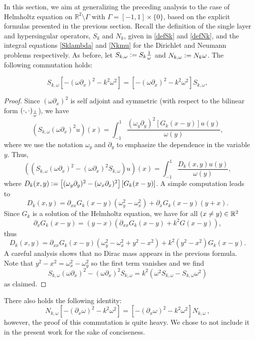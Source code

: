 \documentclass[a4paper]{article}
\begin{document}
In this section, we aim at generalizing the preceding analysis to the case of Helmholtz equation on $\mathbb{R}^2\setminus \Gamma$ 
with $\Gamma = [-1,1]\times\{0\}$, based on the explicit formulas presented in the previous section. Recall the definition of the single layer and 
hypersingular operators, $S_k$ and $N_k$, given in \eqref{defSk} and \eqref{defNk}, and the integral equations \eqref{Sklambda} and 
\eqref{Nkmu} for the Dirichlet and Neumann problems respectively. As before, let $S_{k,\omega} \mathrel{\mathop:}= S_k \frac{1}{\omega}$ and 
$N_{k,\omega} \mathrel{\mathop:}= N_k \omega$. The following commutation holds:	
\begin{theorem}
	\label{commutations}
	\[S_{k,\omega} \left[-(\omega \partial_x)^2 - k^2\omega^2\right] =  \left[-(\omega \partial_x)^2 - k^2\omega^2\right]S_{k,\omega},\]
\end{theorem}
\begin{proof}
	Since $(\omega \partial_x)^2$ is self adjoint and symmetric (with respect to the bilinear form $\left( \cdot,\cdot\right)_{\frac{1}{\omega}}$), we have 
	\[\left(S_{k,\omega} (\omega \partial_x)^2 u\right)(x)= \int_{-1}^{1} \frac{(\omega_y \partial_y)^2 \left[G_k(x-y)\right] u(y)}{\omega(y)},\]
	where we use the notation $\omega_y$ and $\partial_y$ to emphasize the dependence in the variable $y$. 
	Thus, 
	\[\left(\left(S_{k,\omega} (\omega \partial_x)^2 - (\omega \partial_x)^2 S_{k,\omega}\right)u\right)(x) = \int_{-1}^{1} \frac{D_k(x,y)u(y)}{\omega(y)},\]
	where $D_k(x,y) \mathrel{\mathop:}= \left[(\omega_y \partial_y)^2 - (\omega_x \partial_x)^2\right] \left[G_k(x-y)\right]$. 
	A simple computation leads to 
	\[D_k(x,y) = \partial_{xx}G_k(x-y) (\omega^2_y - \omega^2_x) + \partial_x G_k(x-y)(y + x).\]
	Since $G_k$ is a solution of the Helmholtz equation, we have for all $(x \neq y) \in \mathbb{R}^2$ 
	\[\partial_x G_k(x-y) = (y-x)(\partial_{xx}G_k(x-y) + k^2G(x-y)),\]
	thus
	\[D_k(x,y) = \partial_{xx}G_k(x-y)\left(\omega^2_y - \omega_x^2 + y^2 - x^2\right) + k^2(y^2 - x^2)G_k(x-y) . \]
	A careful analysis shows that no Dirac mass appears in the previous formula.
	Note that $y^2 - x^2 = \omega_x^2 - \omega_y^2$ so the first term vanishes and we find
	\[S_{k,\omega} (\omega \partial_x)^2 - (\omega \partial_x)^2 S_{k,\omega} =  k^2\left(\omega^2 S_{k,\omega} -S_{k,\omega} \omega^2 \right)\]
	as claimed.
\end{proof}
There also holds the following identity:
\[N_{k,\omega} \left[-(\partial_x \omega)^2 - k^2\omega^2\right] =  \left[-(\partial_x \omega)^2 - k^2\omega^2\right]N_{k,\omega}\,,\]
however, the proof of this commutation is quite heavy. We chose to not include it in the present work for the sake of conciseness. 
\end{document}
